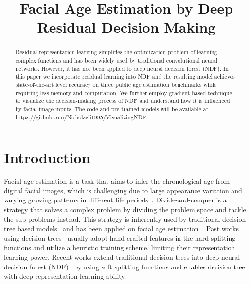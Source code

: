 \documentclass{bmvc2k}
\title{Facial Age Estimation by Deep Residual Decision Making }
\begin{document}
\maketitle

\begin{abstract}
Residual representation learning simplifies the optimization problem of learning complex functions and has been widely used by traditional convolutional neural networks. However, it has not been applied to deep neural decision forest (NDF). In this paper we incorporate residual learning into NDF and the resulting model achieves state-of-the-art level accuracy on three public age estimation benchmarks while requiring less memory and computation. We further employ gradient-based technique to visualize the decision-making process of NDF and understand how it is influenced by facial image inputs. The code and pre-trained models will be available at \url{https://github.com/Nicholasli1995/VisualizingNDF}. 


\end{abstract}

\section{Introduction}
\label{sec:intro}

Facial age estimation is a task that aims to infer the chronological age from digital facial images, which is challenging due to large appearance variation and varying growing patterns in different life periods~\cite{survey}. Divide-and-conquer is a strategy that solves a complex problem by dividing the problem space and tackle the sub-problems instead. This strategy is inherently used by traditional decision tree based models~\cite{tree_detector, tree_regressor, randomforest} and has been applied on facial age estimation~\cite{randomforest}. Past works using decision trees~\cite{tree_detector, tree_regressor, randomforest} usually adopt hand-crafted features in the hard splitting functions and utilize a heuristic training scheme, limiting their representation learning power. Recent works extend traditional decision trees into deep neural decision forest (NDF)~\cite{NDF, Depth, DRFs} by using soft splitting functions and enables decision tree with deep representation learning ability. 
\end{document}
